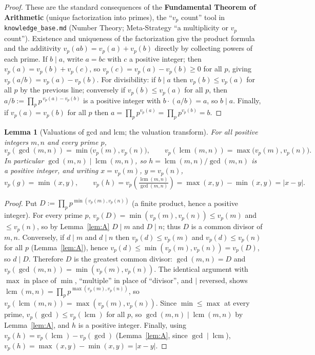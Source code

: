 \documentclass[11pt]{article}
\theoremstyle{plain}
\newtheorem{lemma}{Lemma}
\theoremstyle{definition}
\theoremstyle{remark}
\begin{document}
\begin{proof}
These are the standard consequences of the \textbf{Fundamental Theorem of
Arithmetic} (unique factorization into primes), the ``$v_p$ count'' tool in
\texttt{knowledge\_base.md} (Number Theory; Meta-Strategy ``a multiplicity or
$v_p$ count''). Existence and uniqueness of the factorization give the product
formula and the additivity $v_p(ab)=v_p(a)+v_p(b)$ directly by collecting
powers of each prime. If $b\mid a$, write $a=bc$ with $c$ a positive integer;
then $v_p(a)=v_p(b)+v_p(c)$, so $v_p(c)=v_p(a)-v_p(b)\ge 0$ for all $p$, giving
$v_p(a/b)=v_p(a)-v_p(b)$. For divisibility: if $b\mid a$ then $v_p(b)\le
v_p(a)$ for all $p$ by the previous line; conversely if $v_p(b)\le v_p(a)$ for
all $p$, then $a/b := \prod_p p^{\,v_p(a)-v_p(b)}$ is a positive integer with
$b\cdot(a/b)= a$, so $b\mid a$. Finally, if $v_p(a)=v_p(b)$ for all $p$ then
$a=\prod_p p^{v_p(a)}=\prod_p p^{v_p(b)}=b$.
\end{proof}

\begin{lemma}[Valuations of gcd and lcm; the valuation transform]\label{lem:B}
For all positive integers $m,n$ and every prime $p$,
\[
v_p(\gcd(m,n)) = \min\bigl(v_p(m),v_p(n)\bigr), \qquad
v_p(\operatorname{lcm}(m,n)) = \max\bigl(v_p(m),v_p(n)\bigr).
\]
In particular $\gcd(m,n) \mid \operatorname{lcm}(m,n)$, so
$h=\operatorname{lcm}(m,n)/\gcd(m,n)$ is a positive integer, and writing
$x=v_p(m)$, $y=v_p(n)$,
\[
v_p(g)=\min(x,y),\qquad
v_p(h)=v_p\!\left(\tfrac{\operatorname{lcm}(m,n)}{\gcd(m,n)}\right)=\max(x,y)-\min(x,y)=|x-y|.
\]
\end{lemma}

\begin{proof}
Put $D := \prod_p p^{\min(v_p(m),v_p(n))}$ (a finite product, hence a positive
integer). For every prime $p$, $v_p(D)=\min(v_p(m),v_p(n))\le v_p(m)$ and $\le
v_p(n)$, so by Lemma~\ref{lem:A} $D\mid m$ and $D\mid n$; thus $D$ is a common
divisor of $m,n$. Conversely, if $d\mid m$ and $d\mid n$ then $v_p(d)\le
v_p(m)$ and $v_p(d)\le v_p(n)$ for all $p$ (Lemma~\ref{lem:A}), hence
$v_p(d)\le \min(v_p(m),v_p(n))=v_p(D)$, so $d\mid D$. Therefore $D$ is the
greatest common divisor: $\gcd(m,n)=D$ and $v_p(\gcd(m,n))=\min(v_p(m),v_p(n))$.
The identical argument with $\max$ in place of $\min$, ``multiple'' in place of
``divisor'', and $\mid$ reversed, shows
$\operatorname{lcm}(m,n)=\prod_p p^{\max(v_p(m),v_p(n))}$, so
$v_p(\operatorname{lcm}(m,n))=\max(v_p(m),v_p(n))$. Since $\min\le\max$ at
every prime, $v_p(\gcd)\le v_p(\operatorname{lcm})$ for all $p$, so
$\gcd(m,n)\mid\operatorname{lcm}(m,n)$ by Lemma~\ref{lem:A}, and $h$ is a
positive integer. Finally, using $v_p(h)=v_p(\operatorname{lcm})-v_p(\gcd)$
(Lemma~\ref{lem:A}, since $\gcd\mid\operatorname{lcm}$),
$v_p(h)=\max(x,y)-\min(x,y)=|x-y|$.
\end{proof}
\end{document}
